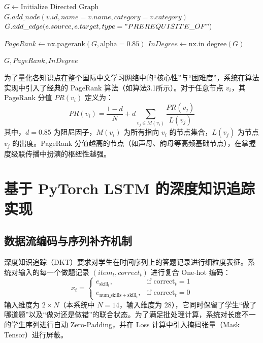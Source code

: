 \begin{algorithm}
\caption{基于 NetworkX 的知识图谱拓扑依赖分析算法}
\begin{algorithmic}[1]
    \State $G \gets \text{Initialize Directed Graph}$
        \State $G.add\_node(v.id, name=v.name, category=v.category)$
    \EndFor
        \State $G.add\_edge(e.source, e.target, type="PREREQUISITE\_OF")$
    \EndFor
    
    \State $PageRank \gets \text{nx.pagerank}(G, \text{alpha}=0.85)$ 
    \State $InDegree \gets \text{nx.in\_degree}(G)$
    
    \State \Return $G, PageRank, InDegree$
\EndProcedure
\end{algorithmic}
\end{algorithm}

为了量化各知识点在整个国际中文学习网络中的“核心性”与“困难度”，系统在算法实现中引入了经典的 PageRank 算法（如算法3.1所示）。对于任意节点 $v_i$，其 PageRank 分值 $PR(v_i)$ 定义为：
\begin{equation}
PR(v_i) = \frac{1-d}{N} + d \sum_{v_j \in M(v_i)} \frac{PR(v_j)}{L(v_j)}
\end{equation}
其中，$d=0.85$ 为阻尼因子，$M(v_i)$ 为所有指向 $v_i$ 的节点集合，$L(v_j)$ 为节点 $v_j$ 的出度。PageRank 分值越高的节点（如声母、韵母等高频基础节点），在掌握度级联传播中扮演的枢纽性越强。

\section{基于 PyTorch LSTM 的深度知识追踪实现}

\subsection{数据流编码与序列补齐机制}
深度知识追踪（DKT）要求对学生在时间序列上的答题记录进行细粒度表征。系统对输入的每一个做题记录 $(item_t, correct_t)$ 进行复合 One-hot 编码：
\begin{equation}
x_t = 
\begin{cases} 
e_{\text{skill}_t}, & \text{if } \text{correct}_t = 1 \\
e_{\text{num\_skills} + \text{skill}_t}, & \text{if } \text{correct}_t = 0
\end{cases}
\end{equation}
输入维度为 $2 \times N$（本系统中 $N=14$，输入维度为 28），它同时保留了学生“做了哪道题”以及“做对还是做错”的联合状态。为了满足批处理计算，系统对长度不一的学生序列进行自动 Zero-Padding，并在 Loss 计算中引入掩码张量（Mask Tensor）进行屏蔽。


